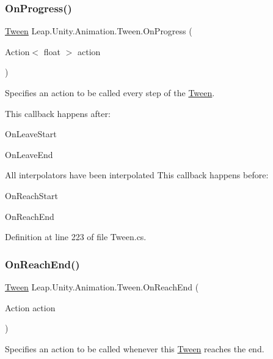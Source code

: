 \subsubsection{\texorpdfstring{OnProgress()}{OnProgress()}}
{\footnotesize\ttfamily \mbox{\hyperlink{struct_leap_1_1_unity_1_1_animation_1_1_tween}{Tween}} Leap.\+Unity.\+Animation.\+Tween.\+On\+Progress (\begin{DoxyParamCaption}\item[{Action$<$ float $>$}]{action }\end{DoxyParamCaption})}



Specifies an action to be called every step of the \mbox{\hyperlink{struct_leap_1_1_unity_1_1_animation_1_1_tween}{Tween}}. 

This callback happens after\+:
\begin{DoxyItemize}
\item On\+Leave\+Start
\item On\+Leave\+End
\item All interpolators have been interpolated This callback happens before\+:
\item On\+Reach\+Start
\item On\+Reach\+End 
\end{DoxyItemize}

Definition at line 223 of file Tween.\+cs.

\mbox{\label{struct_leap_1_1_unity_1_1_animation_1_1_tween_a6444cd8ffe0160d1431e091f3c4d8649}} 
\subsubsection{\texorpdfstring{OnReachEnd()}{OnReachEnd()}}
{\footnotesize\ttfamily \mbox{\hyperlink{struct_leap_1_1_unity_1_1_animation_1_1_tween}{Tween}} Leap.\+Unity.\+Animation.\+Tween.\+On\+Reach\+End (\begin{DoxyParamCaption}\item[{Action}]{action }\end{DoxyParamCaption})}



Specifies an action to be called whenever this \mbox{\hyperlink{struct_leap_1_1_unity_1_1_animation_1_1_tween}{Tween}} reaches the end. 



